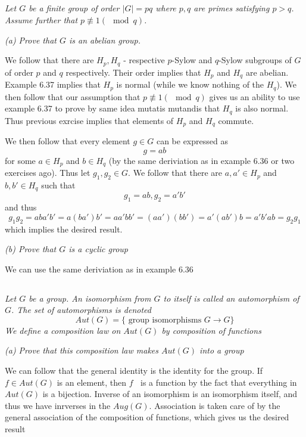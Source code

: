 \documentclass[11pt,oneside,titlepage]{book}
\DeclareMathOperator \inv {^{-1}}
\newcommand{\set}[1]{\{ #1 \}}
\begin{document}
\subsection{}

\textit{Let $G$ be a finite group of order $|G| = pq$ where $p, q$ are
  primes satisfying $p > q$. Assume further that $p \not \equiv 1 (\mod
  q)$. }

\textit{(a) Prove that $G$ is an abelian group. }

We follow that there are $H_p, H_q$ - respective $p$-Sylow and
$q$-Sylow subgroups of $G$ of order $p$ and $q$ respectively.  Their
order implies that $H_p$ and $H_q$ are abelian. Example 6.37 implies
that $H_p$ is normal (while we know nothing of the $H_q$).  We then
follow that our assumption that $p \not \equiv 1 (\mod q)$ gives us an
ability to use example 6.37 to prove by same idea mutatis mutandis
that $H_q$ is also normal. Thus previous exrcise implies that elements
of $H_p$ and $H_q$ commute.

We then follow that every element $g \in G$ can be expressed as
$$g = a b$$
for some $a \in H_p$ and $b \in H_q$ (by the same deriviation as in
example 6.36 or two exercises ago). Thus let $g_1, g_2 \in G$. We
follow that there are $a, a' \in H_p$ and $b, b' \in H_q$ such that
$$g_1 = a b, g_2 = a' b'$$
and thus
$$g_1 g_2 = ab a' b' = a (b a') b' = a a' b b'
= (a a') (b b') = a' (a b') b = a' b' a b = g_2 g_1$$ which implies
the desired result.

\textit{(b) Prove that $G$ is a cyclic group}

We can use the same deriviation as in example 6.36

\subsection{}

\textit{Let $G$ be a group. An isomorphism from $G$ to itself is
  called an automorphism of $G$. The set of automorphisms is denoted
  $$Aut(G) = \set{\text{ group isomorphisms } G \to G}$$
  We define a composition law on $Aut(G)$ by composition of functions
}

\textit{(a) Prove that this composition law makes $Aut(G)$ into a
group}

We can follow that the general identity is the identity for the group.
If $f \in Aut(G)$ is an element, then $f\inv$ is a function by the
fact that everything in $Aut(G)$ is a bijection. Inverse of an
isomorphism is an isomorphism itself, and thus we have inrverses in
the $Aug(G)$.  Association is taken care of by the general association
of the composition of functions, which gives us the desired result
\end{document}
